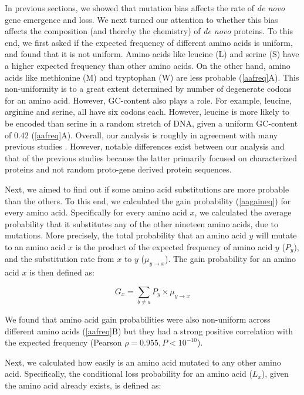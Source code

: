 \documentclass[12pt,a4paper]{article}
\begin{document}
In previous sections, we showed that mutation bias affects the rate of \textit{de novo} gene emergence and loss. We next turned our attention to whether this bias affects the composition (and thereby the chemistry) of \textit{de novo} proteins. To this end, we first asked if the expected frequency of different amino acids is uniform, and found that it is not uniform. Amino acids like leucine (L) and serine (S) have a higher expected frequency than other amino acids. On the other hand, amino acids like methionine (M) and tryptophan (W) are less probable (\autoref{aafreq}{\color{blue}A}). This non-uniformity is to a great extent determined by number of degenerate codons for an amino acid. However, GC-content also plays a role. For example, leucine, arginine and serine, all have six codons each. However, leucine is more likely to be encoded than serine in a random stretch of DNA, given a uniform GC-content of 0.42 (\autoref{aafreq}{\color{blue}A}). Overall, our analysis is roughly in agreement with many previous studies \citep{aasubOhta,aafreq3,aafreq4}. However, notable differences exist between our analysis and that of the previous studies because the latter primarily focused on characterized proteins and not random proto-gene derived protein sequences. 

Next, we aimed to find out if some amino acid substitutions are more probable than the others. To this end, we calculated the gain probability (\autoref{aagaineq}) for every amino acid. Specifically for every amino acid $x$, we calculated the average probability that it substitutes any of the other nineteen amino acids, due to mutations. More precisely, the total probability that an amino acid $y$ will mutate to an amino acid $x$ is the product of the expected frequency of amino acid $y$ ($P_y$), and the substitution rate from $x$ to $y$ ($\mu_{y\to x}$). The gain probability for an amino acid $x$ is then defined as:

\begin{equation}
G_x = \sum_{b \neq a} P_y \times \mu_{y\to x}
\label{aagaineq}
\end{equation}

We found that amino acid gain probabilities were also non-uniform across different amino acids (\autoref{aafreq}{\color{blue}B}) but they had a strong positive correlation with the expected frequency (Pearson $\rho = 0.955, P<10^{-10}$).

Next, we calculated how easily is an amino acid mutated to any other amino acid. Specifically, the conditional loss probability for an amino acid ($L_x$), given the amino acid already exists, is defined as:
\end{document}
